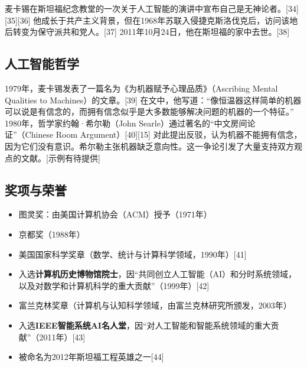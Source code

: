 麦卡锡在斯坦福纪念教堂的一次关于人工智能的演讲中宣布自己是无神论者。[34][35][36] 他成长于共产主义背景，但在1968年苏联入侵捷克斯洛伐克后，访问该地后转变为保守派共和党人。[37] 2011年10月24日，他在斯坦福的家中去世。[38]
\subsection{人工智能哲学}
1979年，麦卡锡发表了一篇名为《为机器赋予心理品质》（Ascribing Mental Qualities to Machines）的文章。[39] 在文中，他写道：“像恒温器这样简单的机器可以说是有信念的，而拥有信念似乎是大多数能够解决问题的机器的一个特征。” 1980年，哲学家约翰·希尔勒（John Searle）通过著名的“中文房间论证”（Chinese Room Argument）[40][15] 对此提出反驳，认为机器不能拥有信念，因为它们没有意识。希尔勒主张机器缺乏意向性。这一争论引发了大量支持双方观点的文献。[示例有待提供]
\subsection{奖项与荣誉}
\begin{itemize}
\item 图灵奖：由美国计算机协会（ACM）授予（1971年）  
\item 京都奖（1988年）  
\item 美国国家科学奖章（数学、统计与计算科学领域，1990年）[41]  
\item 入选\textbf{计算机历史博物馆院士}，因“共同创立人工智能（AI）和分时系统领域，以及对数学和计算机科学的重大贡献”（1999年）[42]  
\item 富兰克林奖章（计算机与认知科学领域，由富兰克林研究所颁发，2003年）  
\item 入选\textbf{IEEE智能系统AI名人堂}，因“对人工智能和智能系统领域的重大贡献”（2011年）[43]  
\item 被命名为2012年斯坦福工程英雄之一[44] 
\end{itemize} 
